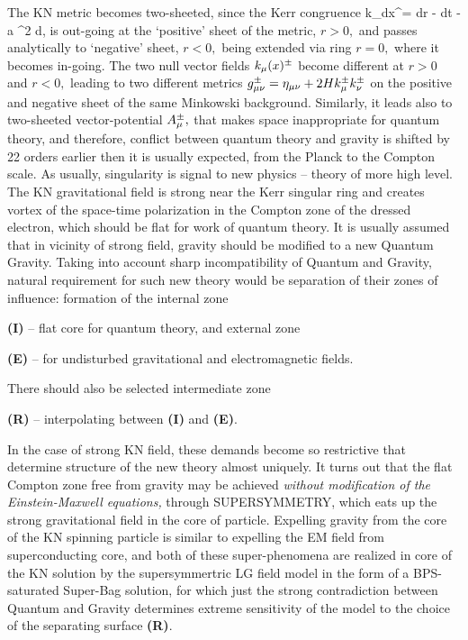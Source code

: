 \documentclass[aps,prd,twocolumn,showpacs]{revtex4}
\begin{document}
The KN metric becomes two-sheeted, since the Kerr congruence \be k_\m dx^\m = dr - dt - a \sin ^2
\theta d\phi,  \label{km} \ee  is out-going at the `positive' sheet of the metric, $r>0 ,$ and
passes analytically to `negative' sheet, $r<0 ,$  being extended via ring $r=0,$  where it becomes
in-going. The two null vector fields $k_\mu(x)^\pm$ become different at $r>0$ and $r<0 ,$ leading to
two different metrics $ g_{\mu\nu}^\pm =\eta_{\mu\nu} + 2H k_\mu^\pm k_\nu^\pm $ on the positive and negative
sheet of the same Minkowski background. Similarly, it leads also to two-sheeted vector-potential
$A_{\mu}^\pm ,$ that makes space inappropriate for quantum theory, and therefore, conflict between
quantum theory
 and gravity is shifted by 22 orders earlier then it is usually expected, from the Planck to the Compton scale.
 As usually, singularity is signal to new physics --  theory of more high level.
 The KN gravitational field is strong near the Kerr singular ring and creates vortex of the space-time polarization
   in the Compton zone of the dressed electron, which should be flat for work of quantum theory. It is
usually assumed that in vicinity of strong field, gravity  should be modified to a new Quantum Gravity.
Taking into account sharp incompatibility of Quantum and Gravity, natural requirement for such new theory
would be separation of their zones of influence: formation of the internal zone

\textbf{(I)} --
 flat core for quantum theory, and external zone

 \textbf{(E)} -- for undisturbed gravitational and electromagnetic
fields.

There should also be selected intermediate zone

\textbf{(R)} --  interpolating between \textbf{(I)} and \textbf{(E)}.

\noindent In the case of strong KN field, these demands become so restrictive that determine  structure of
the new theory almost uniquely.  It turns out that the flat Compton zone free from gravity may be
achieved \emph{without modification of the Einstein-Maxwell equations,} through SUPERSYMMETRY,
which eats up  the strong gravitational field in the core of particle. Expelling gravity from the
core of the KN spinning particle
 is similar to expelling the EM field from superconducting core, and  both of these super-phenomena are
 realized in core of the KN solution by the supersymmertric LG field model
\cite{FMVW,HLosShifm,AbrTown,CvQRey,CvGrRey,GibTown,ChibShif,WesBag} in the form of a BPS-saturated Super-Bag solution, for which just
the strong contradiction between Quantum and Gravity determines extreme sensitivity of the model to
the choice of the separating surface \textbf{(R)}.
\end{document}
